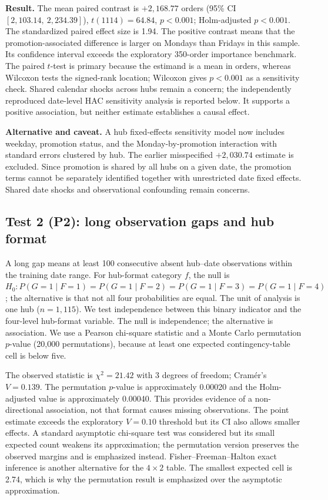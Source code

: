 \documentclass[10pt,a4paper,twocolumn]{article}
\begin{document}
\textbf{Result.} The mean paired contrast is $+2{,}168.77$ orders (95\% CI $[2{,}103.14,\ 2{,}234.39]$), $t(1114)=64.84$, $p<0.001$; Holm-adjusted $p<0.001$. The standardized paired effect size is 1.94. The positive contrast means that the promotion-associated difference is larger on Mondays than Fridays in this sample. Its confidence interval exceeds the exploratory 350-order importance benchmark. The paired $t$-test is primary because the estimand is a mean in orders, whereas Wilcoxon tests the signed-rank location; Wilcoxon gives $p<0.001$ as a sensitivity check. Shared calendar shocks across hubs remain a concern; the independently reproduced date-level HAC sensitivity analysis is reported below. It supports a positive association, but neither estimate establishes a causal effect.

\textbf{Alternative and caveat.} A hub fixed-effects sensitivity model now includes weekday, promotion status, and the Monday-by-promotion interaction with standard errors clustered by hub.  The earlier misspecified $+2{,}030.74$ estimate is excluded. Since promotion is shared by all hubs on a given date, the promotion terms cannot be separately identified together with unrestricted date fixed effects. Shared date shocks and observational confounding remain concerns.

\subsection{Test 2 (P2): long observation gaps and hub format}
A long gap means at least 100 consecutive absent hub--date observations within the training date range. For hub-format category $f$, the null is $H_0:P(G=1\mid F=1)=P(G=1\mid F=2)=P(G=1\mid F=3)=P(G=1\mid F=4)$; the alternative is that not all four probabilities are equal. The unit of analysis is one hub ($n=1{,}115$). We test independence between this binary indicator and the four-level hub-format variable. The null is independence; the alternative is association. We use a Pearson chi-square statistic and a Monte Carlo permutation $p$-value (20,000 permutations), because at least one expected contingency-table cell is below five.

The observed statistic is $\chi^2=21.42$ with 3 degrees of freedom; Cram\'er's $V=0.139$. The permutation $p$-value is approximately 0.00020 and the Holm-adjusted value is approximately 0.00040. This provides evidence of a non-directional association, not that format causes missing observations. The point estimate exceeds the exploratory $V=0.10$ threshold but its CI also allows smaller effects.  A standard asymptotic chi-square test was considered but its small expected count weakens its approximation; the permutation version preserves the observed margins and is emphasized instead. Fisher--Freeman--Halton exact inference is another alternative for the $4\times2$ table. The smallest expected cell is 2.74, which is why the permutation result is emphasized over the asymptotic approximation.
\end{document}
